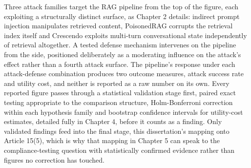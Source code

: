 Three attack families target the RAG pipeline from the top of the figure, each exploiting a structurally distinct surface, 
as Chapter 2 details: indirect prompt injection manipulates retrieved content, PoisonedRAG corrupts the retrieval index itself 
and Crescendo exploits multi-turn conversational state independently of retrieval altogether. 
A tested defense mechanism intervenes on the pipeline from the side, positioned deliberately as a moderating influence on the attack's effect rather than a fourth attack surface. 
The pipeline's response under each attack-defense combination produces two outcome measures, attack success rate and utility cost, and neither is reported as a raw number on its own. 
Every reported figure passes through a statistical validation stage first, paired exact testing appropriate to the comparison structure, Holm-Bonferroni correction within each hypothesis family and 
bootstrap confidence intervals for utility-cost estimates, detailed fully in Chapter 4, before it counts as a finding. Only validated findings feed into the final stage, this dissertation's mapping onto Article 15(5), 
which is why that mapping in Chapter 5 can speak to the compliance-testing question with statistically confirmed evidence rather than figures no correction has touched.
